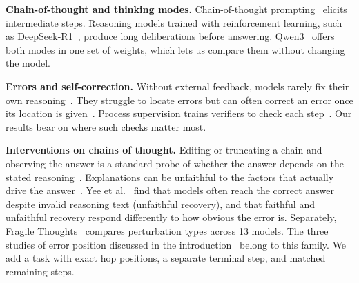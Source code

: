 \documentclass[conference]{IEEEtran}
\begin{document}
\textbf{Chain-of-thought and thinking modes.} Chain-of-thought prompting~\cite{cot} elicits intermediate steps. Reasoning models trained with reinforcement learning, such as DeepSeek-R1~\cite{deepseekr1}, produce long deliberations before answering. Qwen3~\cite{qwen3} offers both modes in one set of weights, which lets us compare them without changing the model.

\textbf{Errors and self-correction.} Without external feedback, models rarely fix their own reasoning~\cite{huang}. They struggle to locate errors but can often correct an error once its location is given~\cite{tyen}. Process supervision trains verifiers to check each step~\cite{lightman}. Our results bear on where such checks matter most.

\textbf{Interventions on chains of thought.} Editing or truncating a chain and observing the answer is a standard probe of whether the answer depends on the stated reasoning~\cite{lanham}. Explanations can be unfaithful to the factors that actually drive the answer~\cite{turpin,chen2025}. Yee et al.~\cite{yee} find that models often reach the correct answer despite invalid reasoning text (unfaithful recovery), and that faithful and unfaithful recovery respond differently to how obvious the error is. Separately, Fragile Thoughts~\cite{fragile} compares perturbation types across 13 models. The three studies of error position discussed in the introduction~\cite{vonrecum,jiamu,ascot} belong to this family. We add a task with exact hop positions, a separate terminal step, and matched remaining steps.


\end{document}
